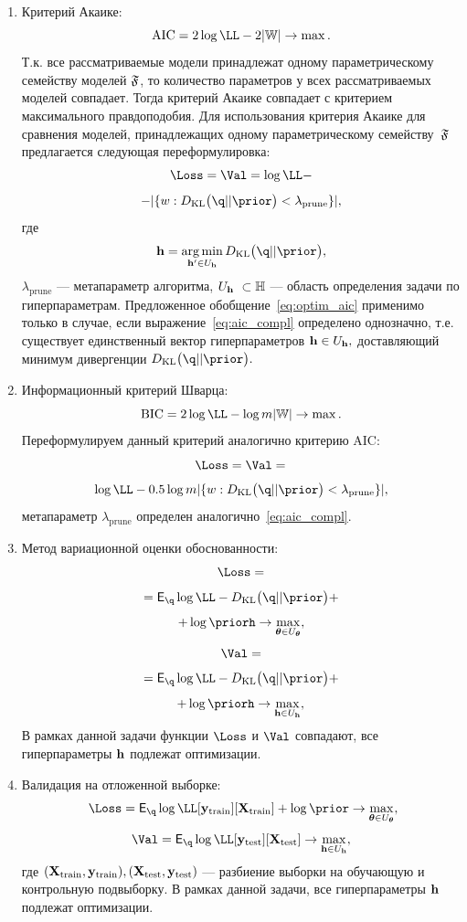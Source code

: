 \begin{enumerate}
\item Критерий Акаике:
\[
   \text{AIC} =  2\log \LL - 2|\Wb| \to \max.
\]
Т.к. все рассматриваемые модели принадлежат одному параметрическому семейству моделей $\mathfrak{F}$, то количество параметров у всех рассматриваемых моделей  совпадает. Тогда критерий Акаике совпадает с критерием максимального правдоподобия. Для использования критерия Акаике для сравнения моделей, принадлежащих одному параметрическому семейству~$\mathfrak{F}$ предлагается следующая переформулировка:
\begin{equation}
\label{eq:optim_aic}
    \Loss = \Val = \log \LL - 
\end{equation}
\[
 - |\{w: \KL{\q}{\prior}<\lambda_\text{prune}\}|,
\]
где 
\begin{equation}\label{eq:aic_compl}\h=\argmin_{\h' \in \Uh} \KL{\q}{\prior},\end{equation} $\lambda_{\text{prune}}$ --- метапараметр алгоритма, $\Uh  \subset \Hb$ --- область определения задачи по гиперпараметрам. Предложенное обобщение~\eqref{eq:optim_aic} применимо только в случае, если выражение~\eqref{eq:aic_compl} определено однозначно, т.е. существует единственный вектор гиперпараметров  $\mathbf{h} \in U_{\mathbf{h}},$ доставляющий минимум дивергенции $\KL{\q}{\prior}.$

\item Информационный критерий Шварца:
\[
    \text{BIC} = 2\log \LL - \log m|\Wb|  \to \max.
\]
Переформулируем данный критерий аналогично критерию AIC:
\begin{equation}
\label{eq:optim_bic}
    \Loss = \Val =  
\end{equation}
\[
\log \LL - 0.5 \log m |\{w: \KL{\q}{\prior}<\lambda_{\text{prune}}\}|,
\]
метапараметр $\lambda_{\text{prune}}$ определен аналогично~\eqref{eq:aic_compl}.

\item Метод вариационной оценки обоснованности:
\begin{equation}
\label{eq:optim_elbo_method}   
    \Loss = 
\end{equation}
\[
= \E_{\q} \log \LL - \KL{\q}{\prior} + 
\]
\[
+\log\priorh \to \max_{\teta \in \Uteta},
\]
\[
     \Val = 
\]
\[
= \E_{\q} \log \LL - \KL{\q}{\prior} +
\]
\[+ \log\priorh \to \max_{\h \in \Uh},
\]
В рамках данной задачи функции $\Loss$ и $\Val$ совпадают, все гиперпараметры $\mathbf{h}$ подлежат оптимизации.

\item Валидация на отложенной выборке:
\begin{equation}
\label{eq:optim_hold_out}
    \Loss = \E_{\q} \log \LL[\y_\text{train}][\X_\text{train}] + \log \prior \to \max_{\teta \in \Uteta},
\end{equation}
\[
    \Val = \E_{\q} \log \LL[\y_\text{test}][\X_\text{test}] \to \max_{\h \in \Uh},
\]
где $(\mathbf{X}_\text{train}, \mathbf{y}_\text{train}), (\mathbf{X}_\text{test}, \mathbf{y}_\text{test})$ --- разбиение выборки на обучающую и контрольную подвыборку.
В рамках данной задачи, все гиперпараметры $\mathbf{h}$ подлежат оптимизации.

\end{enumerate}

